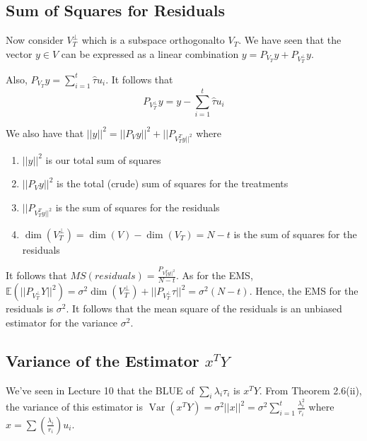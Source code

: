 \documentclass{tufte-book}
\newcommand{\E}{\mathbb{E}}
\newcommand{\Var}{\operatorname{Var}}
\begin{document}
\subsection{Sum of Squares for Residuals}

Now consider $V_{T}^{\perp}$ which is a subspace orthogonalto $V_{T}$. We have seen that the vector $y \in V$ can 
be expressed as a linear combination $y = P_{V_{T}}y + P_{V_{T}^{\perp}}y$. 

Also, $P_{V_{T}}y = \sum_{i = 1}^{t} \hat{\tau}u_{i}$. It follows that 
\[P_{V_{T}^{\perp}}y = y - \sum_{i = 1}^{t} \hat{\tau}u_{i} \]

We also have that $|| y ||^{2} = || P_{V}y||^{2} + ||P_{V_{T}^{T} y ||^{2}}$ where 
\begin{enumerate}
  \item $|| y ||^{2}$ is our total sum of squares
  \item $|| P_{V}y||^{2}$ is the total (crude) sum of squares for the treatments
  \item $||P_{V_{T}^{T} y ||^{2}}$ is the sum of squares for the residuals
  \item $\dim (V_{T}^{\perp}) = \dim(V) - \dim(V_{T}) = N - t$ is the sum of squares for the residuals 
\end{enumerate}

It follows that $MS(residuals) = \frac{P_{V_{T}^{T} y ||^{2}}}{N - t}$. As for the EMS, 
$\E (||P_{V_{T}^{\perp}} Y||^{2}) = \sigma^{2} \dim(V_{T}^{\perp}) + ||P_{V_{T}^{\perp}} \tau||^{2} = \sigma^{2}(N - t)$.
Hence, the EMS for the residuals is $\sigma^{2}$. It follows that the mean square of the residuals is an unbiased estimator 
for the variance $\sigma^{2}$.

\subsection{Variance of the Estimator $x^{T}Y$}

We've seen in Lecture 10 that the BLUE of $\sum_{i} \lambda_i \tau_i$ is $x^{T}Y$. From Theorem 2.6(ii), the variance of this
estimator is $\Var(x^{T}Y) = \sigma^{2} ||x||^{2} = \sigma^{2} \sum_{i = 1}^{t} \frac{\lambda_{i}^{2}}{r_{i}}$ where 
$x = \sum (\frac{\lambda_{i}}{r_{i}}) u_{i}$.
\end{document}
